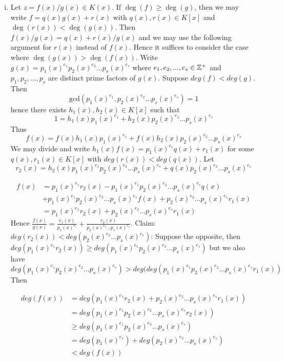 \begin{solution}

\begin{enumerate}[(i)]
   
\item Let $z = f(x)/g(x) \in K(x)$. If $\deg(f) \geq \deg(g)$, 
then we may write $f = q(x)g(x) + r(x)$ with $q(x),r(x) \in K[x]$ and
$\deg(r(x)) < \deg(g(x))$. Then $f(x)/g(x) = q(x) + r(x)/g(x)$ and we may use 
the following argument for $r(x)$ instead of $f(x)$.
Hence it suffices to consider the case 
where $\deg(g(x)) > \deg(f(x))$. Write $g(x) = p_1(x)^{e_1}p_2(x)^{e_2}...p_s(x)^{e_s}$ 
where $e_1,e_2,...,e_s \in \mathbb{Z}^{+}$ and $p_1,p_2,...,p_s$ are distinct 
prime factors of $g(x)$. Suppose $deg(f) < deg(g)$. Then 
$$\text{gcd}(p_1(x)^{e_1},p_2(x)^{e_2}...p_s(x)^{e_s}) = 1$$ hence there exists 
$h_1(x),h_2(x) \in K[x]$ such that $$1 = h_1(x)p_1(x)^{e_1} + h_2(x)p_2(x)^{e_2}...p_s(x)^{e_s}$$ 
Thus $$f(x) = f(x)h_1(x)p_1(x)^{e_1} + f(x)h_2(x)p_2(x)^{e_2}...p_s(x)^{e_s}$$ 
We may divide and write $h_1(x)f(x) = p_1(x)^{e_1}q(x) + r_1(x)$ 
for some $q(x),r_1(x) \in K[x]$ with $deg(r(x)) < deg(q(x))$. 
Let $$r_2(x) = h_2(x)p_1(x)^{e_1}p_2(x)^{e_2}...p_s(x)^{e_s} + q(x)p_2(x)^{e_2}...p_s(x)^{e_s}$$ 

\begin{align*} 
f(x) &= p_1(x)^{e_1}r_2(x) - p_1(x)^{e_1}p_2(x)^{e_2}...p_s(x)^{e_s}q(x) \\
&+ p_1(x)^{e_1}p_2(x)^{e_2}...p_s(x)^{e_s}f(x) + p_2(x)^{e_2}...p_s(x)^{e_s}r_1(x) \\
&= p_1(x)^{e_1}r_2(x) + p_2(x)^{e_2}...p_s(x)^{e_s}r_1(x)
\end{align*}
Hence $\frac{f(x)}{g(x)} = \frac{r_1(x)}{p_1(x)^{e_1}} + \frac{r_2(x)}{p_2(x)^{e_2}...p_s(x)^{e_s}} $. 
Claim: $deg(r_2(x)) < deg(p_2(x)^{e_2}...p_s(x)^{e_s})$: Suppose the opposite, 
then $deg(p_1(x)^{e_1}r_2(x)) \geq deg(p_1(x)^{e_1}p_2(x)^{e_2}...p_s(x)^{e_s})$ 
but we also have 
$$deg(p_1(x)^{e_1}p_2(x)^{e_2}...p_s(x)^{e_s}) >  
deg(deg(p_1(x)^{e_1}p_2(x)^{e_2}...p_s(x)^{e_s}r_1(x))$$
Then
    
\begin{align*}
deg(f(x)) &= deg(p_1(x)^{e_1}r_2(x) + p_2(x)^{e_2}...p_s(x)^{e_s}r_1(x)) \\
&= deg(p_1(x)^{e_1}p_2(x)^{e_2}...p_s(x)^{e_s}r_2(x)) \\
&\geq deg(p_1(x)^{e_1}p_2(x)^{e_2}...p_s(x)^{e_s}) \\
&= deg(p_1(x)^{e_1}) + deg(p_2(x)^{e_2}...p_s(x)^{e_s}) \\
&< deg(f(x))
\end{align*}


\end{enumerate}
\end{solution}
